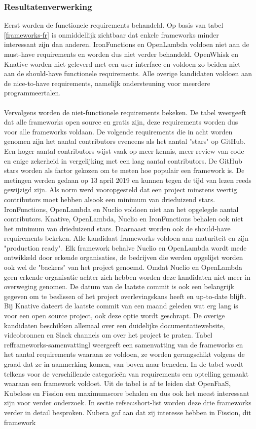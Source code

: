 \subsubsection{Resultatenverwerking}
Eerst worden de functionele requirements behandeld. Op basis van tabel \ref{frameworks-fr} is onmiddellijk zichtbaar dat enkele frameworks minder interessant zijn dan anderen. IronFunctions en OpenLambda voldoen niet aan de must-have requirements en worden dus niet verder behandeld. OpenWhisk en Knative worden niet geleverd met een user interface en voldoen zo beiden niet aan de should-have functionele requirements. Alle overige kandidaten voldoen aan de nice-to-have requirements, namelijk ondersteuning voor meerdere programmeertalen.
\\\\
Vervolgens worden de niet-functionele requirements bekeken. De tabel weergeeft dat alle frameworks open source en gratis zijn, deze requirements worden dus voor alle frameworks voldaan. De volgende requirements die in acht worden genomen zijn het aantal contributors eveneens als het aantal "stars" op GitHub. Een hoger aantal contributors wijst vaak op meer kennis, meer review van code en enige zekerheid in vergelijking met een laag aantal contributors. De GitHub stars worden als factor gekozen om te meten hoe populair een framework is. De metingen werden gedaan op 13 april 2019 en kunnen tegen de tijd van lezen reeds gewijzigd zijn. Als norm werd vooropgesteld dat een project minstens veertig contributors moet hebben alsook een minimum van drieduizend stars. IronFunctions, OpenLambda en Nuclio voldoen niet aan het opgelegde aantal contributors. Knative, OpenLambda, Nuclio en IronFunctions behalen ook niet het minimum van drieduizend stars. Daarnaast worden ook de should-have requirements bekeken. Alle kandidaat frameworks voldoen aan maturiteit en zijn "production ready". Elk framework behalve Nuclio en OpenLambda wordt mede ontwikkeld door erkende organisaties, de bedrijven die werden opgelijst worden ook wel de "backers" van het project genoemd. Omdat Nuclio en OpenLambda geen erkende organisatie achter zich hebben worden deze kandidaten niet meer in overweging genomen. De datum van de laatste commit is ook een belangrijk gegeven om te beslissen of het project overlevingskans heeft en up-to-date blijft. Bij Knative dateert de laatste commit van een maand geleden wat erg lang is voor een open source project, ook deze optie wordt geschrapt. De overige kandidaten beschikken allemaal over een duidelijke documentatiewebsite, videobronnen en Slack channels om over het project te praten. Tabel ref{frameworks-samenvattingl} weergeeft een samenvatting van de frameworks en het aantal requirements waaraan ze voldoen, ze worden gerangschikt volgens de graad dat ze in aanmerking komen, van boven naar beneden. In de tabel wordt telkens voor de verschillende categorieën van requirements een optelling gemaakt waaraan een framework voldoet. Uit de tabel is af te leiden dat OpenFaaS, Kubeless en Fission een maximumscore behalen en dus ook het meest interessant zijn voor verder onderzoek. In sectie ref{sec:short-list} worden deze drie frameworks verder in detail besproken. Nubera gaf aan dat zij interesse hebben in Fission, dit framework 